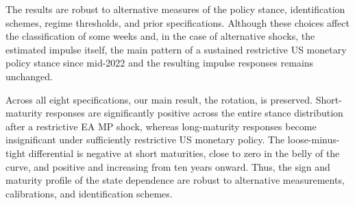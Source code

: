 
The results are robust to alternative measures of the policy stance, identification schemes, regime thresholds, and prior specifications. Although these choices affect the classification of some weeks and, in the case of alternative shocks, the estimated impulse itself, the main pattern of a sustained restrictive US monetary policy stance since mid-2022 and the resulting impulse responses remains unchanged.

Across all eight specifications, our main result, the rotation, is preserved. Short-maturity responses are significantly positive across the entire stance distribution after a restrictive EA MP shock, whereas long-maturity responses become insignificant under sufficiently restrictive US monetary policy. The loose-minus-tight differential is negative at short maturities, close to zero in the belly of the curve, and positive and increasing from ten years onward. Thus, the sign and maturity profile of the state dependence are robust to alternative measurements, calibrations, and identification schemes.



